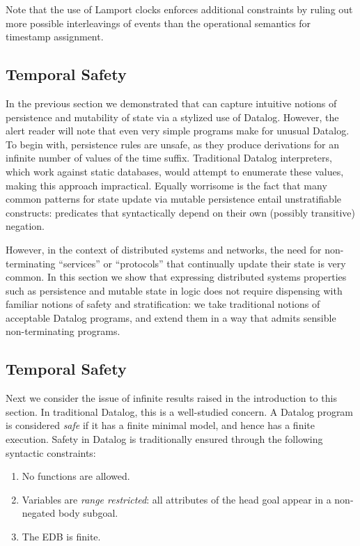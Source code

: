Note that the use of Lamport clocks enforces additional constraints by ruling out more possible interleavings of events than the operational semantics for timestamp assignment. 

\subsection{Temporal Safety}

In the previous section we demonstrated that \slang can capture
intuitive notions of persistence and mutability of state via a
stylized use of Datalog.  However, the alert reader will note that
even very simple \slang programs make for unusual Datalog.
To begin with, persistence rules are unsafe, as they produce derivations for an infinite number
of values of the time suffix.  Traditional Datalog interpreters, which
work against static databases, would attempt to enumerate these
values, making this approach impractical.
Equally worrisome is the fact that many common patterns for state update via mutable
persistence entail unstratifiable constructs: predicates that syntactically depend on their
own (possibly transitive) negation.  

However, in the context of distributed systems and networks, the need
for non-terminating ``services'' or ``protocols'' that continually update their
state
is very common.  In this section we show that expressing distributed systems properties
such as persistence and mutable state in logic does not require
dispensing with familiar notions of safety and stratification: we take
traditional notions of acceptable Datalog programs, and extend them in
a way that admits sensible non-terminating programs.

\subsection{Temporal Safety}
Next we consider the issue of infinite results raised in the introduction to this section.
In traditional Datalog, this is a well-studied concern.
A Datalog program is considered {\em safe} if it has a finite minimal model, and hence has
a finite execution.  Safety in Datalog is traditionally ensured
through the following syntactic constraints:

\begin{enumerate}
%
\item No functions are allowed.
%
\item Variables are \emph{range restricted}: all attributes of the head goal
appear in a non-negated body subgoal.
%
\item The EDB is finite.
%
\end{enumerate}


